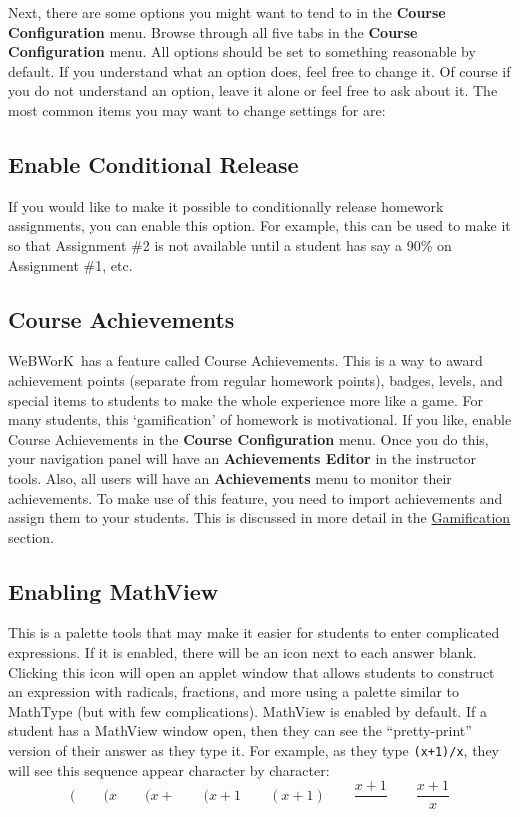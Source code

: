 \documentclass[12pt]{article}
\newcommand{\menu}[1]{\textbf{#1}}
\newcommand{\WW}{WeBWorK}
\newcommand{\FM}{\menu{File Manager}}
\begin{document}

Next, there are some options you might want to tend to in the \menu{Course Configuration} menu.
Browse through all five tabs in the  \menu{Course Configuration} menu.
All options should be set to something reasonable by default.
If you understand what an option does, feel free to change it.
Of course if you do not understand an option, leave it alone or feel free to ask about it.
The most common items you may want to change settings for are:

\subsection{Enable Conditional Release}

If you would like to make it possible to conditionally release homework assignments, you can enable this option.
For example, this can be used to make it so that Assignment \#2 is not available until a student has say a 90\% on Assignment \#1, etc.

\subsection{Course Achievements}

\WW\ has a feature called Course Achievements.
This is a way to award achievement points (separate from regular homework points), badges, levels, and special items to students to make the whole experience more like a game.
For many students, this `gamification' of homework is motivational.
If you like, enable Course Achievements in the \menu{Course Configuration} menu.
Once you do this, your navigation panel will have an \menu{Achievements Editor} in the instructor tools.
Also, all users will have an \menu{Achievements} menu to monitor their achievements.
To make use of this feature, you need to import achievements and assign them to your students.
This is discussed in more detail in the \hyperref[gamification]{Gamification} section.

\subsection{Enabling MathView}

This is a palette tools that may make it easier for students to enter complicated expressions.
If it is enabled, there will be an icon next to each answer blank.
Clicking this icon will open an applet window that allows students to construct an expression with radicals, fractions, and more using a palette similar to MathType (but with few complications).
MathView is enabled by default.
If a student has a MathView window open, then they can see the ``pretty-print'' version of their answer as they type it.
For example, as they type \texttt{(x+1)/x}, they will see this sequence appear character by character: $$(\qquad(x\qquad(x+\qquad(x+1\qquad(x+1)\qquad\frac{x+1}{}\qquad\frac{x+1}{x}$$
\end{document}
